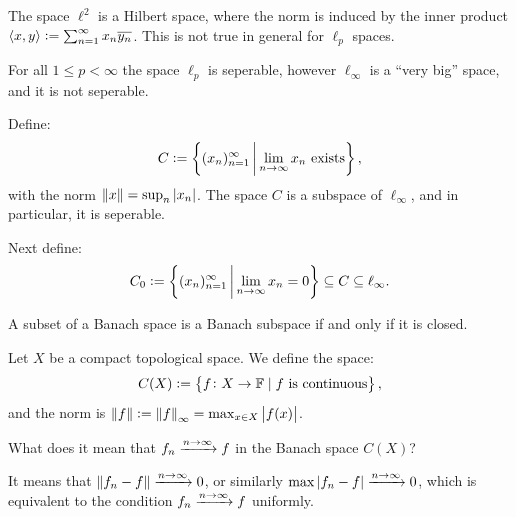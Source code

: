 \documentclass[11pt,a4paper]{article}
\begin{document}
\begin{remark}
  The space $\ell^2$ is a Hilbert space,
  where the norm is induced by the inner product
  $\left\langle x, y \right\rangle := \sum_{n=1}^{\infty} x_n \overline{y_n}$.
  This is not true in general for $\ell_p$ spaces.
\end{remark}

\begin{remark}
  For all $1 \le p < \infty$ the space $\ell_p$ is seperable,
  however $\ell_{\infty}$ is a ``very big'' space,
  and it is not seperable.
\end{remark}

\begin{example}[$C$ and $C_0$]
  Define:
  \[
    C :=
    \left\{(x_n)_{n=1}^{\infty} \,\middle\vert\, \lim_{n \to \infty} x_n \text{ exists}\right\},
  \]
  with the norm $\left\lVert x\right\rVert = \sup_{n} \left\lvert x_n\right\rvert$.
  The space $C$ is a subspace of $\ell_{\infty}$,
  and in particular, it is seperable.
  
  Next define:
  \[
    C_0 :=
    \left\{(x_n)_{n=1}^{\infty} \,\middle\vert\, \lim_{n \to \infty} x_n = 0\right\}
    \subseteq C \subseteq \ell_{\infty}.
  \]
\end{example}

\begin{remark}
  A subset of a Banach space is a Banach subspace if and only if
  it is closed.
\end{remark}

\begin{example}
  Let $X$ be a compact topological space.
  We define the space:
  \[
    C(X) :=
    \left\{f \colon X \to \mathbb F \mid f \text{ is continuous}\right\},
  \]
  and the norm is $\left\lVert f\right\rVert := \left\lVert f\right\rVert_{\infty} = \max_{x \in X} \left\lvert f(x)\right\rvert$.
\end{example}

\begin{question}
  What does it mean that $f_n \xrightarrow{n \to \infty} f$ in
  the Banach space $C(X)$?
\end{question}
\begin{answer}
  It means that $\left\lVert f_n - f\right\rVert \xrightarrow{n \to \infty} 0$,
  or similarly $\max\left\lvert f_n - f\right\rvert \xrightarrow{n \to \infty} 0$,
  which is equivalent to the condition $f_n \xrightarrow{n \to \infty} f$
  uniformly.
\end{answer}
\end{document}
